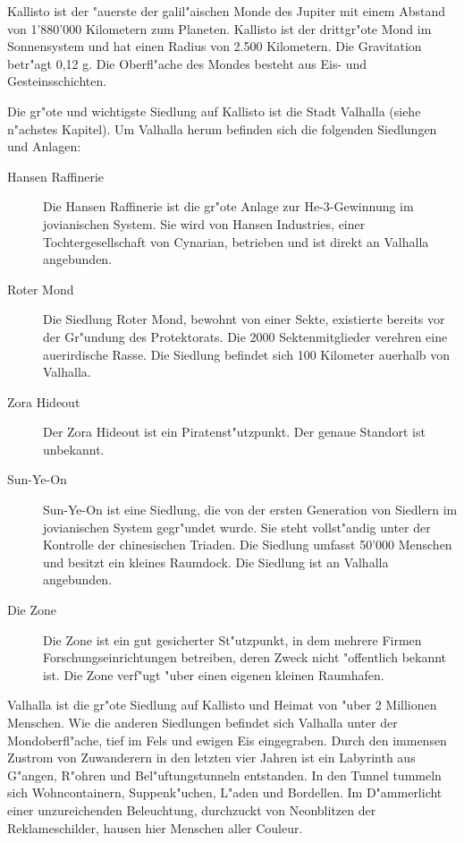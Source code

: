 \clearpage\newpage



Kallisto ist der "au\3erste der galil"aischen Monde des Jupiter mit einem Abstand von 1'880'000 Kilometern zum Planeten. Kallisto ist der drittgr"o\3te Mond im Sonnensystem und hat einen Radius von 2.500 Kilometern. Die Gravitation betr"agt 0,12 g.  Die Oberfl"ache des Mondes besteht aus Eis- und Gesteinsschichten.

Die gr"o\3te und wichtigste Siedlung auf Kallisto ist die Stadt Valhalla (siehe n"achstes Kapitel). Um Valhalla herum befinden sich die folgenden Siedlungen und Anlagen:

\begin{description}
    \item[Hansen Raffinerie] Die Hansen Raffinerie ist die gr"o\3te Anlage zur He-3-Gewinnung im jovianischen System. Sie wird von Hansen 
        Industries, einer Tochtergesellschaft von Cynarian, betrieben und ist direkt an Valhalla angebunden.
    \item[Roter Mond] Die Siedlung Roter Mond, bewohnt von einer Sekte, existierte bereits vor der Gr"undung des Protektorats. Die 2000 
        Sektenmitglieder verehren eine au\3erirdische Rasse. Die Siedlung befindet sich 100 Kilometer au\3erhalb von Valhalla.
    \item[Zora Hideout] Der Zora Hideout ist ein Piratenst"utzpunkt. Der genaue Standort ist unbekannt.
    \item[Sun-Ye-On] Sun-Ye-On ist eine Siedlung, die von der ersten Generation von Siedlern im jovianischen System gegr"undet wurde. Sie 
        steht vollst"andig unter der Kontrolle der chinesischen Triaden. Die Siedlung umfasst 50'000 Menschen und besitzt ein kleines Raumdock. Die Siedlung ist an Valhalla angebunden.
    \item[Die Zone] Die Zone ist ein gut gesicherter St"utzpunkt, in dem mehrere Firmen Forschungseinrichtungen betreiben, deren Zweck nicht 
        "offentlich bekannt ist. Die Zone verf"ugt "uber einen eigenen kleinen Raumhafen.
\end{description}


Valhalla ist die gr"o\3te Siedlung auf Kallisto und Heimat von "uber 2 Millionen Menschen. Wie die anderen Siedlungen befindet sich Valhalla unter der Mondoberfl"ache, tief im Fels und ewigen Eis eingegraben. Durch den immensen Zustrom von Zuwanderern in den letzten vier Jahren ist ein Labyrinth aus G"angen, R"ohren und Bel"uftungstunneln entstanden. In den Tunnel tummeln sich Wohncontainern, Suppenk"uchen, L"aden und Bordellen. Im D"ammerlicht einer unzureichenden Beleuchtung, durchzuckt von Neonblitzen der Reklameschilder, hausen hier Menschen aller Couleur.

